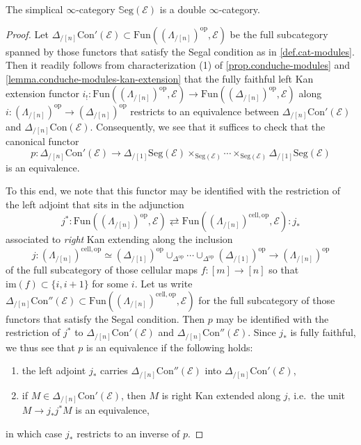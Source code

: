 \documentclass[10pt,a4paper]{amsart}
\newcommand{\Con}{\mathrm{Con}}
\newcommand{\E}{\mathscr{E}}
\newcommand{\SSEG}{\mathbb{S}\mathrm{eg}}
\newcommand{\Seg}{\mathrm{Seg}}
\newcommand{\fun}{\mathrm{Fun}}
\newcommand{\im}{\mathrm{im}}
\newcommand{\op}{\mathrm{op}}
\begin{document}
\begin{proposition}\label{prop.double-infty-cat-cat-objs}
	The simplical $\infty$-category $\SSEG(\E)$ is a double $\infty$-category.
\end{proposition}

\begin{proof}
	Let $\Delta_{/[n]}\Con'(\E) \subset \fun((\Lambda_{/[n]})^\op, \E)$ be the full subcategory spanned 
	by those functors that satisfy the Segal condition as in \cref{def.cat-modules}.
	Then it readily 
	follows from characterization (1) of \cref{prop.conduche-modules} and \cref{lemma.conduche-modules-kan-extension} that the fully faithful left Kan extension functor 
	$
	i_!: \fun((\Lambda_{/[n]})^\op, \E) \rightarrow \fun((\Delta_{/[n]})^\op, \E)
	$
	along $i : (\Lambda_{/[n]})^\op \rightarrow (\Delta_{/[n]})^\op$
	restricts to an equivalence between $\Delta_{/[n]}\Con'(\E)$ and $\Delta_{/[n]}\Con(\E)$. Consequently, 
	we see that it suffices to check that the canonical functor 
	$$
	p : \Delta_{/[n]}\Con'(\E) \rightarrow {\Delta_{/[1]}}\Seg(\E) \times_{\Seg(\E)} \dotsb \times_{\Seg(\E)} {\Delta_{/[1]}}\Seg(\E)
	$$
	is an equivalence.

	To this end, we note that this functor may be identified with the restriction of the left adjoint 
	that sits in the adjunction
	$$
	j^* : \fun((\Lambda_{/[n]})^\op, \E) \rightleftarrows \fun((\Lambda_{/[n]})^{\mathrm{cell}, \op},\E)  : j_*
	$$
	associated to \textit{right} Kan extending along the inclusion
	$$j : (\Lambda_{/[n]})^{\mathrm{cell},\op} \simeq (\Delta_{/[1]})^\op \cup_{\Delta^\op} \dotsb \cup_{\Delta^\op} (\Delta_{/[1]})^\op \rightarrow (\Lambda_{/[n]})^\op$$
	of the full subcategory of those cellular maps $f : [m] \rightarrow [n]$ so that $\im(f) \subset \{i,i+1\}$ for some $i$. 
	Let us write $\Delta_{/[n]}\Con''(\E) \subset \fun((\Lambda_{/[n]})^{\mathrm{cell}, \op},\E)$ for the full subcategory of 
	those functors that satisfy the Segal condition. Then $p$ may be identified with the restriction of $j^*$ 
	to $\Delta_{/[n]}\Con'(\E)$ and $\Delta_{/[n]}\Con''(\E)$. 
	Since $j_*$ is fully faithful, we thus see that $p$ is an equivalence if the following holds:
	\begin{enumerate}
		\item the left adjoint $j_*$ carries $\Delta_{/[n]}\Con''(\E)$ into $\Delta_{/[n]}\Con'(\E)$,
		\item if $M \in \Delta_{/[n]}\Con'(\E)$, then $M$ is right Kan extended along $j$, i.e.\, the unit
		$M \rightarrow j_*j^*M$ is an equivalence,
	\end{enumerate}
	in which case $j_*$ restricts to an inverse of $p$. 
	

\end{proof}
\end{document}
